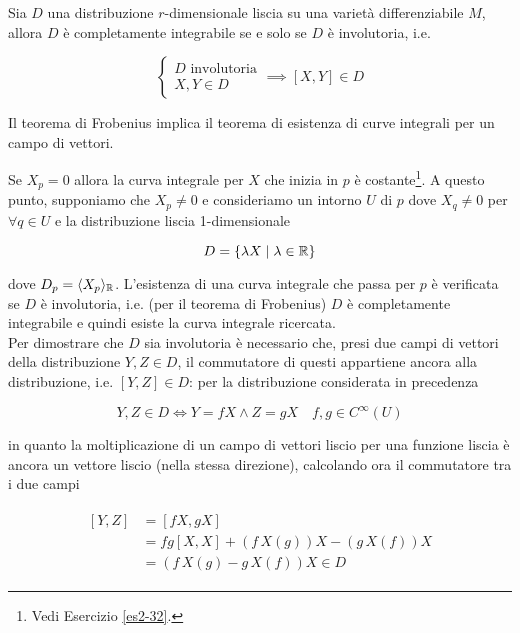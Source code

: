 \begin{theorem}[Frobenius]
	Sia $ D $ una distribuzione $ r $-dimensionale liscia su una varietà differenziabile $ M $, allora $ D $ è completamente integrabile se e solo se $ D $ è involutoria, i.e.
	
	\begin{equation}
		\begin{cases}
			D \text{ involutoria}\\
			X,Y \in D
		\end{cases}
		\implies%
		[X,Y] \in D
	\end{equation}
\end{theorem}

\begin{remark}
	Il teorema di Frobenius implica il teorema di esistenza di curve integrali per un campo di vettori.
\end{remark}

Se $ X_{p} = 0 $ allora la curva integrale per $ X $ che inizia in $ p $ è costante\footnote{%
	Vedi Esercizio \ref{es2-32}.%
}. A questo punto, supponiamo che $ X_{p} \neq 0 $ e consideriamo un intorno $ U $ di $ p $ dove $ X_{q} \neq 0 $ per $ \forall q \in U $ e la distribuzione liscia 1-dimensionale

\begin{equation}
	D = \{ \lambda X \mid \lambda \in \mathbb{R} \}
\end{equation}

dove $ D_{p} = \langle X_{p} \rangle_{\mathbb{R}} $. L'esistenza di una curva integrale che passa per $ p $ è verificata se $ D $ è involutoria, i.e. (per il teorema di Frobenius) $ D $ è completamente integrabile e quindi esiste la curva integrale ricercata.\\
Per dimostrare che $ D $ sia involutoria è necessario che, presi due campi di vettori della distribuzione $ Y,Z \in D $, il commutatore di questi appartiene ancora alla distribuzione, i.e. $ [Y,Z] \in D $: per la distribuzione considerata in precedenza

\begin{equation}
	Y,Z \in D \iff Y = fX \wedge Z = gX \quad f,g \in C^{\infty}(U)
\end{equation}

in quanto la moltiplicazione di un campo di vettori liscio per una funzione liscia è ancora un vettore liscio (nella stessa direzione), calcolando ora il commutatore tra i due campi

\begin{align}
	\begin{split}
		[Y,Z] &= [fX,gX]\\
		&= fg [X,X] + (f \, X(g)) X - (g \, X(f)) X\\
		&= (f \, X(g) - g \, X(f)) X \in D
	\end{split}
\end{align}

